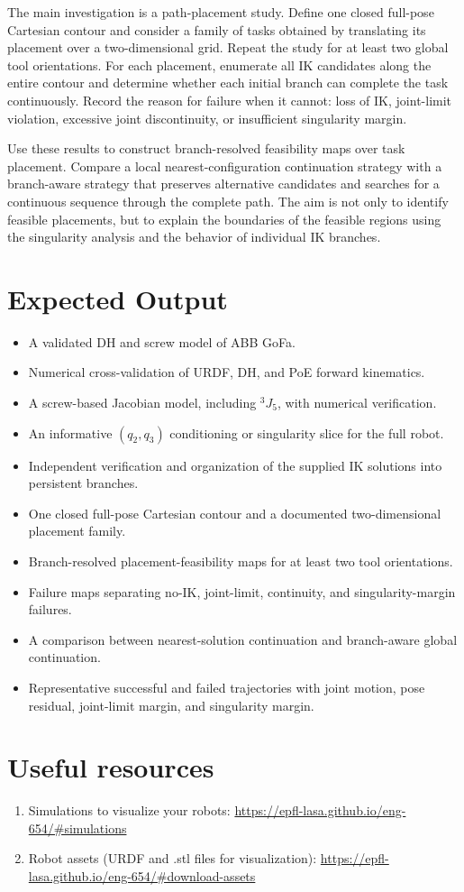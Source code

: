 \documentclass[11pt,a4paper]{article}
\begin{document}
The main investigation is a path-placement study. Define one closed full-pose Cartesian contour and consider a family of tasks obtained by translating its placement over a two-dimensional grid. Repeat the study for at least two global tool orientations. For each placement, enumerate all IK candidates along the entire contour and determine whether each initial branch can complete the task continuously. Record the reason for failure when it cannot: loss of IK, joint-limit violation, excessive joint discontinuity, or insufficient singularity margin.

Use these results to construct branch-resolved feasibility maps over task placement. Compare a local nearest-configuration continuation strategy with a branch-aware strategy that preserves alternative candidates and searches for a continuous sequence through the complete path. The aim is not only to identify feasible placements, but to explain the boundaries of the feasible regions using the singularity analysis and the behavior of individual IK branches.

\section*{Expected Output}
\begin{itemize}
  \item A validated DH and screw model of ABB GoFa.
  \item Numerical cross-validation of URDF, DH, and PoE forward kinematics.
  \item A screw-based Jacobian model, including $^{3}J_{5}$, with numerical verification.
  \item An informative $(q_2,q_3)$ conditioning or singularity slice for the full robot.
  \item Independent verification and organization of the supplied IK solutions into persistent branches.
  \item One closed full-pose Cartesian contour and a documented two-dimensional placement family.
  \item Branch-resolved placement-feasibility maps for at least two tool orientations.
  \item Failure maps separating no-IK, joint-limit, continuity, and singularity-margin failures.
  \item A comparison between nearest-solution continuation and branch-aware global continuation.
  \item Representative successful and failed trajectories with joint motion, pose residual, joint-limit margin, and singularity margin.
\end{itemize}

\section*{Useful resources}
\begin{enumerate}
	\item Simulations to visualize your robots: \url{https://epfl-lasa.github.io/eng-654/#simulations} 
	\item Robot assets (URDF and .stl files for visualization): \url{https://epfl-lasa.github.io/eng-654/#download-assets}
\end{enumerate}
\end{document}
